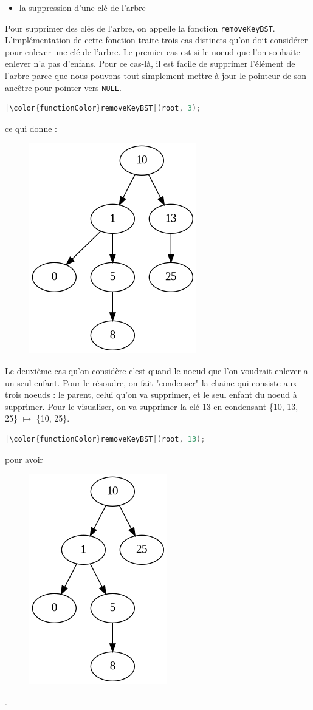 \documentclass[10pt]{article} %
\begin{document}
\begin{itemize}
    \item[\ding{43}] la suppression d'une clé de l'arbre
\end{itemize}

Pour supprimer des clés de l'arbre, on appelle la fonction \texttt{removeKeyBST}. L'implémentation de cette fonction
traite trois cas distincts qu'on doit considérer pour enlever une clé de l'arbre. Le premier cas est si le noeud que l'on
souhaite enlever n'a pas d'enfans. Pour ce cas-là, il est facile de supprimer l'élément de l'arbre parce que nous pouvons tout
simplement mettre à jour le pointeur de son ancêtre pour pointer vers \texttt{NULL}.

\begin{lstlisting}[language=C, keywordstyle=\color{objectPurp}, otherkeywords={root}]
    |\color{functionColor}removeKeyBST|(root, 3);
\end{lstlisting}


ce qui donne :

\begin{figure}[h!]
    \centering
    \includegraphics[width=.25\textwidth]{media/rem3.png}
\end{figure}

Le deuxième cas qu'on considère c'est quand le noeud que l'on voudrait enlever a un seul enfant. Pour le résoudre, on fait "condenser"
la chaine qui consiste aux trois noeuds : le parent, celui qu'on va supprimer, et le seul enfant du noeud à supprimer. Pour le visualiser, on va
supprimer la clé 13 en condensant \{10, 13, 25\} $\mapsto$ \{10, 25\}.

\begin{lstlisting}[language=C, keywordstyle=\color{objectPurp}, otherkeywords={root}]
    |\color{functionColor}removeKeyBST|(root, 13);
\end{lstlisting}

pour avoir

\begin{figure}[h!]
    \centering
    \includegraphics[width=.25\textwidth]{media/rem13.png}
\end{figure}.
\end{document}
